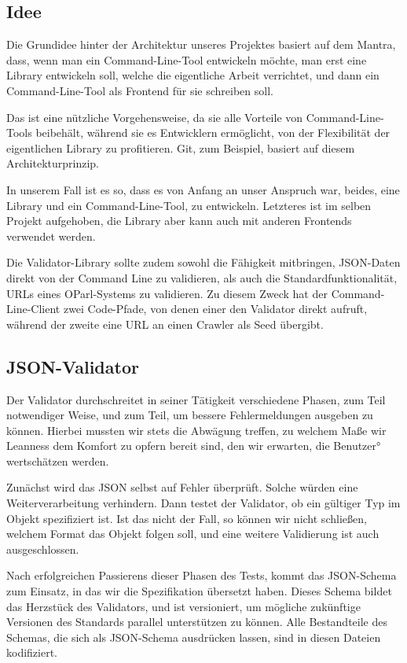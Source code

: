 \documentclass[12pt, fleqn]{scrartcl}
\begin{document}
\subsection{Idee}

Die Grundidee hinter der Architektur unseres Projektes basiert auf dem Mantra, dass, wenn man ein Command-Line-Tool entwickeln möchte, man erst eine Library entwickeln soll, welche die eigentliche Arbeit verrichtet, und dann ein Command-Line-Tool als Frontend für sie schreiben soll.

Das ist eine nützliche Vorgehensweise, da sie alle Vorteile von Command-Line-Tools beibehält, während sie es Entwicklern ermöglicht, von der Flexibilität der eigentlichen Library zu profitieren. Git, zum Beispiel, basiert auf diesem Architekturprinzip.

In unserem Fall ist es so, dass es von Anfang an unser Anspruch war, beides, eine Library und ein Command-Line-Tool, zu entwickeln. Letzteres ist im selben Projekt aufgehoben, die Library aber kann auch mit anderen Frontends verwendet werden.

Die Validator-Library sollte zudem sowohl die Fähigkeit mitbringen, JSON-Daten direkt von der Command Line zu validieren, als auch die Standardfunktionalität, URLs eines OParl-Systems zu validieren. Zu diesem Zweck hat der Command-Line-Client zwei Code-Pfade, von denen einer den Validator direkt aufruft, während der zweite eine URL an einen Crawler als Seed übergibt.

\subsection{JSON-Validator}

Der Validator durchschreitet in seiner Tätigkeit verschiedene Phasen, zum Teil notwendiger Weise, und zum Teil, um bessere Fehlermeldungen ausgeben zu können. Hierbei mussten wir stets die Abwägung treffen, zu welchem Maße wir Leanness dem Komfort zu opfern bereit sind, den wir erwarten, die Benutzer° wertschätzen werden.

Zunächst wird das JSON selbst auf Fehler überprüft. Solche würden eine Weiterverarbeitung verhindern. Dann testet der Validator, ob ein gültiger Typ im Objekt spezifiziert ist. Ist das nicht der Fall, so können wir nicht schließen, welchem Format das Objekt folgen soll, und eine weitere Validierung ist auch ausgeschlossen.

Nach erfolgreichen Passierens dieser Phasen des Tests, kommt das JSON-Schema zum Einsatz, in das wir die Spezifikation übersetzt haben. Dieses Schema bildet das Herzstück des Validators, und ist versioniert, um mögliche zukünftige Versionen des Standards parallel unterstützen zu können. Alle Bestandteile des Schemas, die sich als JSON-Schema ausdrücken lassen, sind in diesen Dateien kodifiziert.
\end{document}
